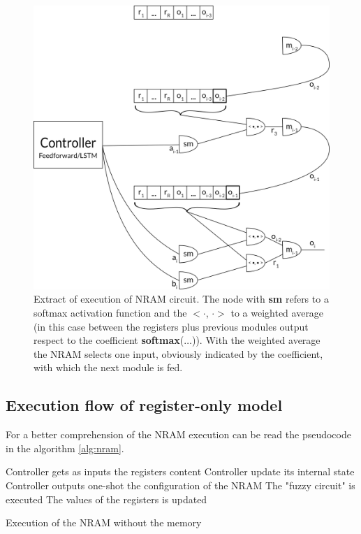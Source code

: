 \begin{figure}[t!]
	\centering
	\includegraphics[width=\textwidth]{figures/register-only-model.png}
	\caption{Extract of execution of NRAM circuit. The node with \textbf{sm} refers to a softmax activation function and the $<\cdot$, $\cdot>$ to a weighted average (in this case between the registers plus previous modules output respect to the coefficient \textbf{softmax}($\dots$)). With the weighted average the NRAM selects one input, obviously indicated by the coefficient, with which the next module is fed.}
	\label{fig:register-only-model}
\end{figure}

\subsection{Execution flow of register-only model}\label{subsec:execution-register-only}
For a better comprehension of the NRAM execution can be read the pseudocode in the algorithm \ref{alg:nram}.
\begin{algorithm}
	\begin{algorithmic}[1]
		\label{lst:nram:line-5}
			\State Controller gets as inputs the registers content\label{lst:nram:line-6}
				\State Controller update its internal state
			\EndIf
			\State Controller outputs one-shot the configuration of the NRAM 
			\label{lst:nram:line-8}
			\State The "fuzzy circuit" is executed \label{lst:nram:line-9}
			\State The values of the registers is updated\label{lst:nram:line-10}
		\EndFor
	\end{algorithmic}
	\caption{Execution of the NRAM without the memory}\label{alg:nram}
\end{algorithm}

